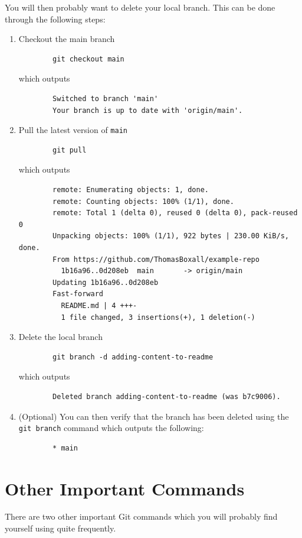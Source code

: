\documentclass[a4paper, 11pt]{article}
\begin{document}
You will then probably want to delete your local branch. This can be done through the following steps:
\begin{enumerate}
    \item Checkout the main branch
    \begin{verbatim}
        git checkout main
    \end{verbatim}
    which outputs
    \begin{verbatim}
        Switched to branch 'main'
        Your branch is up to date with 'origin/main'.
    \end{verbatim}
    \item Pull the latest version of \verb|main|
    \begin{verbatim}
        git pull
    \end{verbatim}
    which outputs
    \begin{verbatim}
        remote: Enumerating objects: 1, done.
        remote: Counting objects: 100% (1/1), done.
        remote: Total 1 (delta 0), reused 0 (delta 0), pack-reused 0
        Unpacking objects: 100% (1/1), 922 bytes | 230.00 KiB/s, done.
        From https://github.com/ThomasBoxall/example-repo
          1b16a96..0d208eb  main       -> origin/main
        Updating 1b16a96..0d208eb
        Fast-forward
          README.md | 4 +++-
          1 file changed, 3 insertions(+), 1 deletion(-)
    \end{verbatim}
    \item Delete the local branch
    \begin{verbatim}
        git branch -d adding-content-to-readme
    \end{verbatim}
    which outputs
    \begin{verbatim}
        Deleted branch adding-content-to-readme (was b7c9006).
    \end{verbatim}
    \item (Optional) You can then verify that the branch has been deleted using the \verb|git branch| command which outputs the following:
    \begin{verbatim}
        * main
    \end{verbatim}
\end{enumerate}

\section{Other Important Commands}
There are two other important Git commands which you will probably find yourself using quite frequently.
\end{document}
